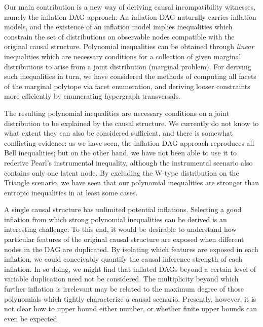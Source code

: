 Our main contribution is a new way of deriving causal incompatibility witnesses, namely the inflation DAG approach. An inflation DAG naturally carries inflation models, and the existence of an inflation model implies inequalities which constrain the set of distributions on observable nodes compatible with the original causal structure. Polynomial inequalities can be obtained through \emph{linear} inequalities which are necessary conditions for a collection of given marginal distributions to arise from a joint distribution (marginal problem). For deriving such inequalities in turn, we have considered the methods of computing all facets of the marginal polytope via facet enumeration, and deriving looser constraints more efficiently by enumerating hypergraph transversals.

The resulting polynomial inequalities are necessary conditions on a joint distribution to be explained by the causal structure. We currently do not know to what extent they can also be considered sufficient, and there is somewhat conflicting evidence: as we have seen, the inflation DAG approach reproduces all Bell inequalities; but on the other hand, we have not been able to use it to rederive Pearl's instrumental inequality, although the instrumental scenario also contains only one latent node. By excluding the W-type distribution on the Triangle scenario, we have seen that our polynomial inequalities are stronger than entropic inequalities in at least some cases.


A single causal structure has unlimited potential inflations. Selecting a good inflation from which strong polynomial inequalities can be derived is an interesting challenge. To this end, it would be desirable to understand how particular features of the original causal structure are exposed when different nodes in the DAG are duplicated. By isolating which features are exposed in each inflation, we could conceivably quantify the causal inference strength of each inflation. In so doing, we might find that inflated DAGs beyond a certain level of variable duplication need not be considered. The multiplicity beyond which further inflation is irrelevant may be related to the maximum degree of those polynomials which tightly characterize a causal scenario. Presently, however, it is not clear how to upper bound either number, or whether finite upper bounds can even be expected.

